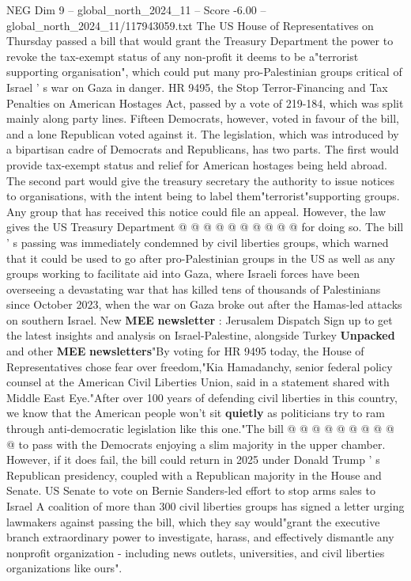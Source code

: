 \begin{textsample}{NEG Dim 9 – global\_north\_2024\_11 – Score -6.00 – global\_north\_2024\_11/117943059.txt}  \label{ex:f9_neg_052}
The US House of Representatives on Thursday passed a bill that would grant the Treasury Department the power to revoke the tax-exempt status of any non-profit it deems to be a"terrorist supporting organisation", which could put many pro-Palestinian groups critical of Israel ' s war on Gaza in danger.
HR 9495, the Stop Terror-Financing and Tax Penalties on American Hostages Act, passed by a vote of 219-184, which was split mainly along party lines.
Fifteen Democrats, however, voted in favour of the bill, and a lone Republican voted against it.
The legislation, which was introduced by a bipartisan cadre of Democrats and Republicans, has two parts.
The first would provide tax-exempt status and relief for American hostages being held abroad.
The second part would give the treasury secretary the authority to issue notices to organisations, with the intent being to label them"terrorist"supporting groups.
Any group that has received this notice could file an appeal.
However, the law gives the US Treasury Department @ @ @ @ @ @ @ @ @ @ for doing so.
The bill ' s passing was immediately condemned by civil liberties groups, which warned that it could be used to go after pro-Palestinian groups in the US as well as any groups working to facilitate aid into Gaza, where Israeli forces have been overseeing a devastating war that has killed tens of thousands of Palestinians since October 2023, when the war on Gaza broke out after the Hamas-led attacks on southern Israel.
New \textbf{MEE} \textbf{newsletter} : Jerusalem Dispatch Sign up to get the latest insights and analysis on Israel-Palestine, alongside Turkey \textbf{Unpacked} and other \textbf{MEE} \textbf{newsletters}"By voting for HR 9495 today, the House of Representatives chose fear over freedom,"Kia Hamadanchy, senior federal policy counsel at the American Civil Liberties Union, said in a statement shared with Middle East Eye."After over 100 years of defending civil liberties in this country, we know that the American people won't sit \textbf{quietly} as politicians try to ram through anti-democratic legislation like this one."The bill @ @ @ @ @ @ @ @ @ @ to pass with the Democrats enjoying a slim majority in the upper chamber.
However, if it does fail, the bill could return in 2025 under Donald Trump ' s Republican presidency, coupled with a Republican majority in the House and Senate.
US Senate to vote on Bernie Sanders-led effort to stop arms sales to Israel A coalition of more than 300 civil liberties groups has signed a letter urging lawmakers against passing the bill, which they say would"grant the executive branch extraordinary power to investigate, harass, and effectively dismantle any nonprofit organization - including news outlets, universities, and civil liberties organizations like ours".

\end{textsample}

